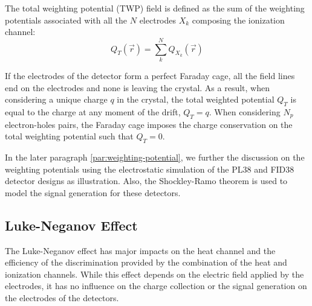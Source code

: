 
The total weighting potential (TWP)  field is defined as the sum of the weighting potentials associated with all the $N$ electrodes $X_k$ composing the ionization channel:
\begin{equation}
\label{eq:twp}
Q_T (\vec{r}) = \sum_k^N Q_{X_k} (\vec{r})
\end{equation}

If the electrodes of the detector form a perfect Faraday cage, all the field lines end on the electrodes and none is leaving the crystal. As a result, when considering a unique charge $q$ in the crystal, the total weighted potential $Q_T$ is equal to the charge at any moment of the drift, $Q_T = q$. When considering $N_p$ electron-holes pairs, the Faraday cage imposes the charge conservation on the total weighting potential such that $Q_T = 0$.

In the later paragraph \ref{par:weighting-potential}, we further the discussion on the weighting potentials using the electrostatic simulation of the PL38 and FID38 detector designs as illustration. Also, the Shockley-Ramo theorem is used to model the signal generation for these detectors.



\subsection{Luke-Neganov Effect}
\label{par:luke-neganov}


The Luke-Neganov effect has major impacts on the heat channel and the efficiency of the discrimination provided by the combination of the heat and ionization channels. While this effect depends on the electric field applied by the electrodes, it has no influence on the charge collection or the signal generation on the electrodes of the detectors.  


